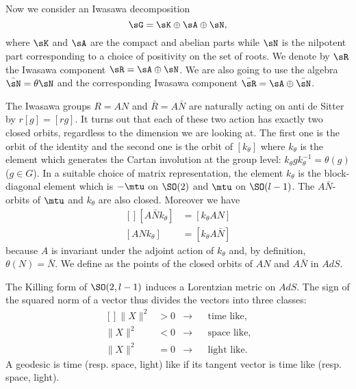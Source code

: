 Now we consider an Iwasawa decomposition
\begin{equation}
	\sG=\sK\oplus\sA\oplus\sN,
\end{equation}
where $\sK$ and $\sA$ are the compact and abelian parts while $\sN$ is the nilpotent part corresponding to a choice of positivity on the set of roots. We denote by $\sR$ the Iwasawa component $\sR=\sA\oplus\sN$. We are also going to use the algebra $\bar\sN=\theta\sN$ and the corresponding Iwasawa component $\bar\sR=\sA\oplus\bar\sN$.

The Iwasawa groups $R=AN$ and $\bar R=A\bar N$ are naturally acting on anti de Sitter by $r[g]=[rg]$. It turns out that each of these two action has exactly two closed orbits, regardless to the dimension we are looking at. The first one is the orbit of the identity and the second one is the orbit of $[k_{\theta}]$ where $k_{\theta}$ is the element which generates the Cartan involution at the group level: $k_{\theta}gk_{\theta}^{-1}=\theta(g)$ ($g\in G$). In a suitable choice of matrix representation, the element $k_{\theta}$ is the block-diagonal element which is $-\mtu$ on $\SO(2)$ and $\mtu$ on $\SO(l-1)$. The $A\bar N$-orbits of $\mtu$ and $k_{\theta}$ are also closed. Moreover we have
\begin{equation}
	\begin{aligned}[]
		[A\bar N k_{\theta}]&=[k_{\theta}AN]\\
		[AN k_{\theta}]&=[k_{\theta}A\bar N]
	\end{aligned}
\end{equation}
because $A$ is invariant under the adjoint action of $k_{\theta}$ and, by definition, $\theta(N)=\bar N$. We define as  the points of the closed orbits of $AN$ and $A\bar N$ in $AdS$.

The Killing form of $\SO(2,l-1)$ induces a Lorentzian metric on $AdS$. The sign of the squared norm of a vector thus divides the vectors into three classes:
\begin{equation}
	\begin{aligned}[]
		\| X \|^2&>0&\rightarrow&&\text{time like,}\\
		\| X \|^2&<0&\rightarrow&&\text{space like,}\\
		\| X \|^2&=0&\rightarrow&&\text{light like.}
	\end{aligned}
\end{equation}
A geodesic is time (resp. space, light) like if its tangent vector is time like (resp. space, light).

